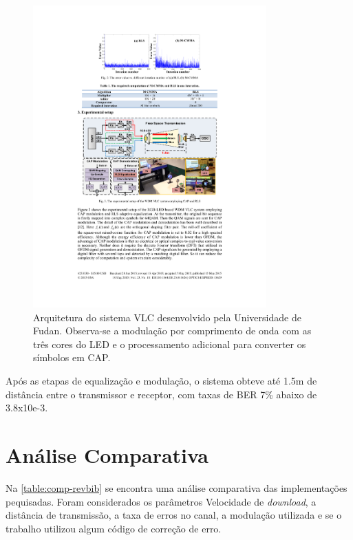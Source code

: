 	\begin{figure}[ht]
		\caption{\label{figure:fudan-architecture}Arquitetura do sistema VLC desenvolvido pela Universidade de Fudan. Observa-se a modulação por comprimento de onda com as três cores do LED e o processamento adicional para converter os símbolos em CAP.}
		\centering
		\includegraphics[width=0.8\textwidth, trim={4.5cm 10cm 4.5cm 10.1cm},clip]{fudan4.pdf}
	\end{figure}
	
	Após as etapas de equalização e modulação, o sistema obteve até 1.5m de distância entre o transmissor e receptor, com taxas de BER 7\% abaixo de 3.8x10e-3.
	
	\section{Análise Comparativa}
	
	Na \autoref{table:comp-revbib} se encontra uma análise comparativa das implementações pequisadas. Foram considerados os parâmetros Velocidade de \textit{download}, a distância de transmissão, a taxa de erros no canal, a modulação utilizada e se o trabalho utilizou algum código de correção de erro.
	
